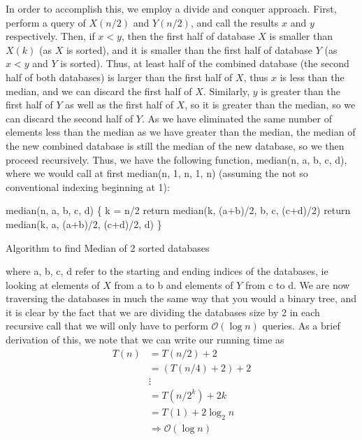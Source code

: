 \documentclass[11pt,letterpaper]{article}
\begin{document}
In order to accomplish this, we employ a divide and conquer approach. First, perform a query of $X(n/2)$ and $Y(n/2)$, and call the results $x$ and $y$ respectively. Then, if $x<y$, then the first half of database $X$ is smaller than $X(k)$ (as $X$ is sorted), and it is smaller than the first half of database $Y$ (as $x<y$ and $Y$ is sorted). Thus, at least half of the combined database (the second half of both databases) is larger than the first half of $X$, thus $x$ is less than the median, and we can discard the first half of $X$. Similarly, $y$ is greater than the first half of $Y$ as well as the first half of $X$, so it is greater than the median, so we can discard the second half of $Y$. As we have eliminated the same number of elements less than the median as we have greater than the median, the median of the new combined database is still the median of the new database, so we then proceed recursively. Thus, we have the following function, median(n, a, b, c, d), where we would call at first median(n, 1, n, 1, n) (assuming the not so conventional indexing beginning at 1):

\begin{algorithm}[h]
	median(n, a, b, c, d) \{ 
	\BlankLine
	k = n/2\;
	 {
	return median(k, (a+b)/2, b, c, (c+d)/2)\;}{
	return median(k, a, (a+b)/2, (c+d)/2, d)\;} \}
	\caption{Algorithm to find Median of 2 sorted databases}
\end{algorithm}
where a, b, c, d refer to the starting and ending indices of the databases, ie looking at elements of $X$ from a to b and elements of $Y$ from c to d. We are now traversing the databases in much the same way that you would a binary tree, and it is clear by the fact that we are dividing the databases size by 2 in each recursive call that we will only have to perform $\mathcal{O}(\log n)$ queries. As a brief derivation of this, we note that we can write our running time as
\begin{align*}
	T(n) &= T(n/2) + 2 \\
	&= (T(n/4) + 2) + 2 \\
	&\vdots \\
	&= T(n/2^k) + 2k \\
	&= T(1) + 2\log_2 n \\
	&\Rightarrow \mathcal{O}(\log n)
\end{align*}
\end{document}
